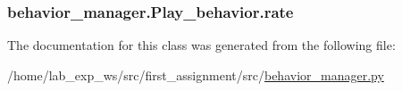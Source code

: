 \subsubsection[{\texorpdfstring{rate}{rate}}]{\setlength{\rightskip}{0pt plus 5cm}behavior\+\_\+manager.\+Play\+\_\+behavior.\+rate}\hypertarget{classbehavior__manager_1_1Play__behavior_af636412228a2da30ad114266cbd121e3}{}\label{classbehavior__manager_1_1Play__behavior_af636412228a2da30ad114266cbd121e3}


The documentation for this class was generated from the following file\+:\begin{DoxyCompactItemize}
\item 
/home/lab\+\_\+exp\+\_\+ws/src/first\+\_\+assignment/src/\hyperlink{behavior__manager_8py}{behavior\+\_\+manager.\+py}\end{DoxyCompactItemize}

